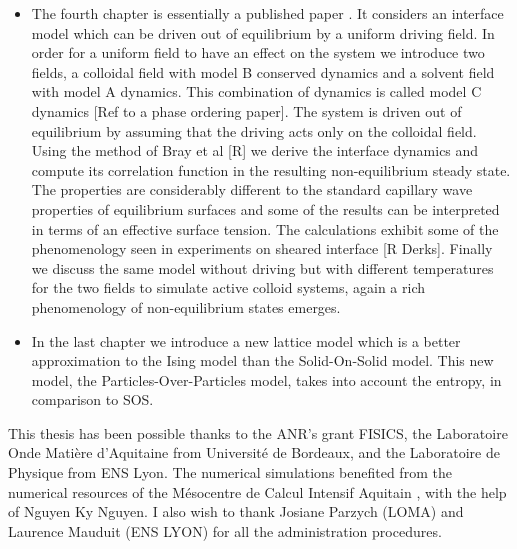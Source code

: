 \begin{itemize}
   
    \item The fourth chapter is essentially a published paper \cite{dean_effect_2020}. 
    It considers an interface model which can be driven out of equilibrium by a uniform driving field. In order for a uniform field to have an effect on the system we introduce two fields, a colloidal field with model B conserved dynamics and a solvent field with model A dynamics. This combination of dynamics is called model C dynamics [Ref to a phase ordering paper]. The system is driven out of equilibrium by assuming that the driving acts only on the colloidal field. Using the method of Bray et al [R] we derive the interface dynamics and compute its correlation function in the resulting non-equilibrium steady state. The properties are considerably different to the standard capillary wave properties of equilibrium surfaces and some of the results can be interpreted in terms of an effective surface tension. The calculations exhibit some of the phenomenology seen in experiments on sheared interface [R Derks]. Finally we discuss the same model without driving but with different temperatures for the two fields to simulate active colloid systems, again a rich phenomenology of non-equilibrium states emerges.
    \item In the last chapter we introduce a new lattice model which is a better approximation to the Ising model than the Solid-On-Solid model. This new model, the Particles-Over-Particles model, takes into account the entropy, in comparison to SOS.
\end{itemize}

This thesis has been possible thanks to the ANR's grant FISICS, the Laboratoire Onde Matière d'Aquitaine from Université de Bordeaux, and the Laboratoire de Physique  from ENS Lyon. The numerical simulations benefited from the numerical resources of the Mésocentre de Calcul Intensif Aquitain \cite{noauthor_mesocentre_nodate}, with the help of Nguyen Ky Nguyen. I also wish to thank Josiane Parzych (LOMA) and Laurence Mauduit (ENS LYON) for all the administration procedures.
